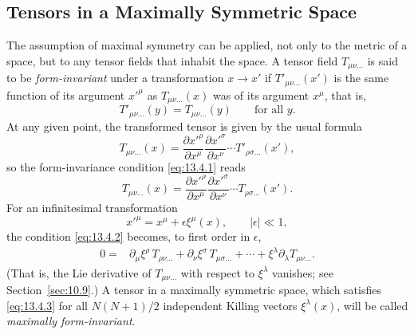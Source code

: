 
\subsection{Tensors in a Maximally Symmetric Space}\label{sec:13.4}

The assumption of maximal symmetry can be applied, not only to the metric of
a space, but to any tensor fields that inhabit the space. A tensor field
\(T_{\mu\nu\ldots}\) is said to be \emph{form-invariant} under a
transformation \(x\longrightarrow x'\) if
\(T'_{\mu\nu\ldots}(x')\) is the same function of its argument \(x'^\mu\)
as \(T_{\mu\nu\ldots}(x)\) was of its argument \(x^\mu\), that is,
\begin{equation}
  T'_{\mu\nu\ldots}(y)
  =
  T_{\mu\nu\ldots}(y)
  \qquad\text{for all \(y\).}
  \tag{13.4.1}\label{eq:13.4.1}
\end{equation}
At any given point, the transformed tensor is given by the usual formula
\[
  T_{\mu\nu\ldots}(x)
  =
  \frac{\partial x'^\rho}{\partial x^\mu}
  \frac{\partial x'^\sigma}{\partial x^\nu}
  \cdots
  T'_{\rho\sigma\ldots}(x'),
\]
so the form-invariance condition \eqref{eq:13.4.1} reads
\begin{equation}
  T_{\mu\nu\ldots}(x)
  =
  \frac{\partial x'^\rho}{\partial x^\mu}
  \frac{\partial x'^\sigma}{\partial x^\nu}
  \cdots
  T_{\rho\sigma\ldots}(x').
  \tag{13.4.2}\label{eq:13.4.2}
\end{equation}
For an infinitesimal transformation
\[
  x'^\mu=x^\mu+\epsilon\xi^\mu(x),
  \qquad
  \lvert\epsilon\rvert\ll1,
\]
the condition \eqref{eq:13.4.2} becomes, to first order in \(\epsilon\),
\begin{equation}
  \begin{aligned}
  0={}&
  \partial_\mu\xi^\rho\,T_{\rho\nu\ldots}
  +\partial_\nu\xi^\sigma\,T_{\mu\sigma\ldots}
  +\cdots
  +\xi^\lambda\partial_\lambda T_{\mu\nu\ldots}.
  \end{aligned}
  \tag{13.4.3}\label{eq:13.4.3}
\end{equation}
(That is, the Lie derivative of \(T_{\mu\nu\ldots}\) with respect to
\(\xi^\lambda\) vanishes; see Section~\ref{sec:10.9}.) A tensor in a
maximally symmetric space, which satisfies \eqref{eq:13.4.3} for all
\(N(N+1)/2\) independent Killing vectors \(\xi^\lambda(x)\), will be called
\emph{maximally form-invariant}.

